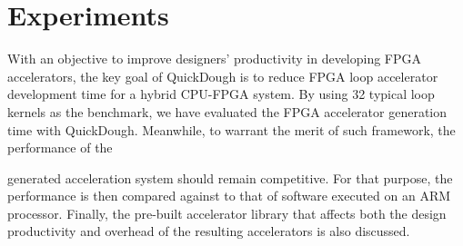 \section{Experiments}\label{sec:experiments}
With an objective to improve designers' productivity in developing FPGA accelerators, the key goal
of QuickDough is to reduce FPGA loop accelerator development time for a hybrid CPU-FPGA system.
By using 32 typical loop kernels as the benchmark, we have evaluated the FPGA accelerator generation 
time with QuickDough. Meanwhile, to warrant the merit of such framework, the performance of the 

generated acceleration system should remain competitive. For that purpose, the performance is then 
compared against to that of software executed on an ARM processor. Finally, the pre-built accelerator 
library that affects both the design productivity and overhead of the resulting accelerators is also
discussed.




